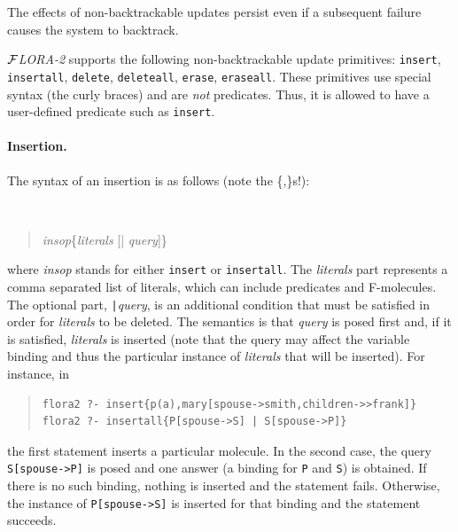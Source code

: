 \documentclass[11pt]{article}
\newcommand{\FLORA}{{\mbox{${\cal F}${\small\it LORA}\rm\emph{-2}}}\xspace}
\begin{document}
%
The effects of non-backtrackable updates persist even if a subsequent failure
causes the system to backtrack.

\FLORA supports the following non-backtrackable update primitives:
{\tt insert}, {\tt insertall}, {\tt delete}, {\tt deleteall},
{\tt erase}, {\tt eraseall}. These primitives use special syntax (the curly
braces) and are \emph{not} predicates. Thus, it is allowed to have a
user-defined predicate such as {\tt insert}.

%
\paragraph{Insertion.} The syntax of an insertion is as follows (note the
\{,\}s!):
{\tt
\begin{quote}
\emph{insop}\{\emph{literals} [| \emph{query}]\}
\end{quote}
}
where {\it insop} stands for either {\tt insert} or {\tt insertall}.
The
{\it literals} part represents a comma separated list of literals,
which can include
predicates and \mbox{F-molecules}. The optional part, {\tt |}{\it query},
is an additional condition that must be satisfied in order for
\emph{literals} to be deleted.
The semantics is that \emph{query} is posed first and, if it is
satisfied, \emph{literals} is inserted (note that the query may affect the
variable binding and thus the particular instance of \emph{literals} that
will be inserted). For instance, in
\begin{quote}
\begin{verbatim}
flora2 ?- insert{p(a),mary[spouse->smith,children->>frank]}
flora2 ?- insertall{P[spouse->S] | S[spouse->P]}
\end{verbatim}
\end{quote}
the first statement inserts a particular molecule. In the second case, the
query {\tt S[spouse->P]} is posed and one answer (a binding for {\tt P} and
{\tt S}) is obtained. If there is no such binding, nothing is inserted and
the statement fails. Otherwise, the instance of {\tt P[spouse->S]} is
inserted for that binding and the statement succeeds.
\end{document}
